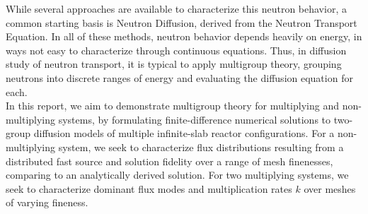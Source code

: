 \documentclass[11pt]{article} %
\begin{document}
While several approaches are available to characterize this neutron behavior, a common starting basis is Neutron Diffusion, derived from the Neutron Transport Equation.
In all of these methods, neutron behavior depends heavily on energy, in ways not easy to characterize through continuous equations.
Thus, in diffusion study of neutron transport, it is typical to apply multigroup theory, grouping neutrons into discrete ranges of energy and evaluating the diffusion equation for each.\\

In this report, we aim to demonstrate multigroup theory for multiplying and non-multiplying systems, by formulating finite-difference numerical solutions to two-group diffusion models of multiple infinite-slab reactor configurations.
For a non-multiplying system, we seek to characterize flux distributions resulting from a distributed fast source and solution fidelity over a range of mesh finenesses, comparing to an analytically derived solution.
For two multiplying systems, we seek to characterize dominant flux modes and multiplication rates $k$ over meshes of varying fineness.


\end{document}
